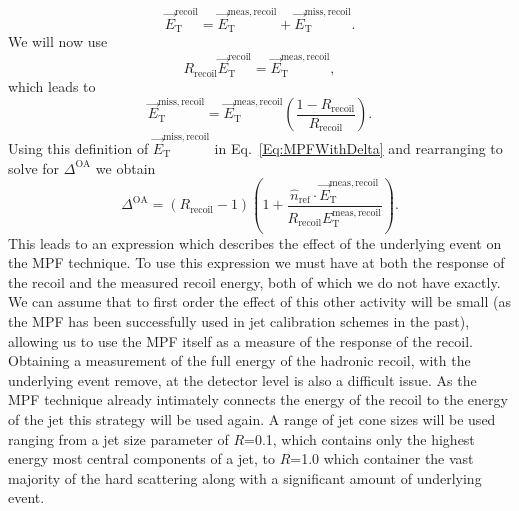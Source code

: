 \begin{equation}
  \vec{E}_{\mathrm T}^{\mathrm{recoil}} = \vec{E}_{\mathrm T}^{\mathrm{meas, recoil}} + \vec{E}_{\mathrm T}^{\mathrm{miss, recoil}}.   
\end{equation}
\noindent 
We will now use 
\begin{equation}
  R_{\mathrm{recoil}}\vec{E}_{\mathrm T}^{\mathrm{recoil}} = \vec{E}_{\mathrm T}^{\mathrm{meas, recoil}}, 
\end{equation}
\noindent
which leads to 
\begin{equation}
  \vec{E}_{\mathrm T}^{\mathrm{miss, recoil}} = \vec{E}_{\mathrm T}^{\mathrm{meas, recoil}}\left(\frac{1-R_{\mathrm{recoil}}}{R_{\mathrm{recoil}}}\right).  
\end{equation}
\noindent
Using this definition of $\vec{E}_{\mathrm T}^{\mathrm{miss, recoil}}$ in Eq.~\ref{Eq:MPFWithDelta} and rearranging to solve for $\Delta^{\mathrm{OA}}$ we obtain 
\begin{equation}
  \Delta^{\mathrm{OA}}=\left(R_{\mathrm{recoil}}-1\right)\left(1+\frac{\hat n_{\mathrm{ref}}\cdot \vec{E}_{\mathrm T}^{\mathrm{meas, recoil}}}{R_{\mathrm{recoil}}{E}_{\mathrm T}^{\mathrm{meas, recoil}}}\right).  
\end{equation} 
This leads to an expression which describes the effect of the underlying event on the MPF technique.  
To use this expression we must have at both the response of the recoil and the measured recoil energy, both of which we do not have exactly.  
We can assume that to first order the effect of this other activity will be small (as the MPF has been successfully used in jet calibration schemes in the past), allowing us to use the MPF itself as a measure of the response of the recoil.  
Obtaining a measurement of the full energy of the hadronic recoil, with the underlying event remove, at the detector level is also a difficult issue.  
As the MPF technique already intimately connects the energy of the recoil to the energy of the jet this strategy will be used again.  
A range of jet cone sizes will be used ranging from a jet size parameter of $R$=0.1, which contains only the highest energy most central components of a jet, to $R$=1.0 which container the vast majority of the hard scattering along with a significant amount of underlying event.   





